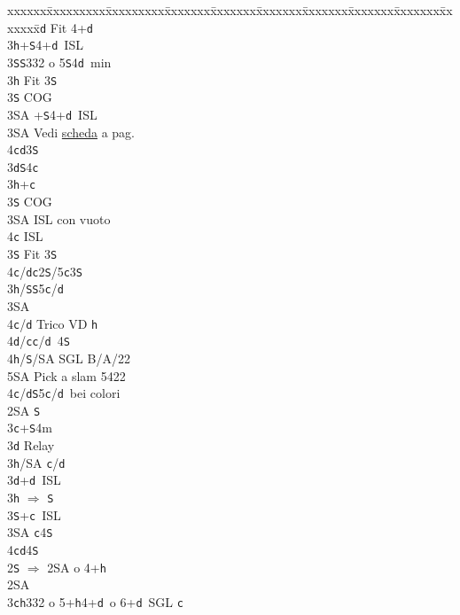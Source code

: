 \documentclass[a4paper,italian]{article}
\newcommand{\BS}{\small{\texttt{S}}}
\newcommand{\BC}{\small{\texttt{c}}}
\newcommand{\BD}{\small{\texttt{d}}}
\newcommand{\BH}{\small{\texttt{h}}}
\newenvironment{bidtable}
{\begin{tabbing}

    xxxxxx\=xxxxxxxxx\=xxxxxxxxx\=xxxxxxx\=xxxxxxx\=xxxxxxx\=xxxxxxx\=xxxxxxx\=xxxxxxx\=xxxxxxx\=\kill}
{\end{tabbing} }%
\begin{document}
\begin{multicols}{2}
\begin{bidtable}
        3\BD \> Fit 4+\BD \+\\
        3\BH {}+\BS 4+\BD\ ISL\\
        3\BS {}\BS 332 o 5\BS 4\BD\ min\-\\
        3\BH \> Fit 3\BS \+\\
        3\BS \> COG\\
        3\small{SA} +\BS 4+\BD\ ISL\-\\
        3\small{SA}\> Vedi \hyperref[Riapertura3SA]{scheda} a pag. \pageref{Riapertura3SA}\\
        4\BC {}\BD 3\BS \-\\
        3\BD {}\BS 4\BC \+\\
        3\BH {}+\BC \+\\
        3\BS \> COG\\
        3\small{SA} \> ISL con vuoto\\
        4\BC \> ISL\-\\
        3\BS \> Fit 3\BS\\
        4\BC/\BD{}\BC2\BS/5\BC3\BS\-\\
        3\BH/\BS {}\BS 5\BC /\BD \+\\
        3\small{SA}\+\\
        4\BC/\BD \> Trico VD \BH \\
        4\BD/\BC {}\BC /\BD\ 4\BS \\
        4\BH/\BS/SA \>\> SGL B/A/22\\
        5\small{SA} \> Pick a slam 5422\-\-\\
        4\BC/\BD {}\BS 5\BC /\BD\ bei colori\-\\
        2\small{SA} \BS \+\\
        3\BC {}+\BS 4m\+\\
        3\BD \> Relay\+\\
        3\BH/SA \BC /\BD \-\-\\
        3\BD {}+\BD\ ISL\\
        3\BH \> $\Rightarrow$ \BS\\
        3\BS {}+\BC\ ISL\\
        3\small{SA} \BC 4\BS \\
        4\BC {}\BD 4\BS \-\-\\
        2\BS \> $\Rightarrow$ 2\small{SA} o 4+\BH \+\\
        2\small{SA}\+\\
        3\BC {}\BH 332 o 5+\BH 4+\BD\ o 6+\BD\ SGL \BC \+\\

\end{bidtable}
\end{multicols}
\end{document}
